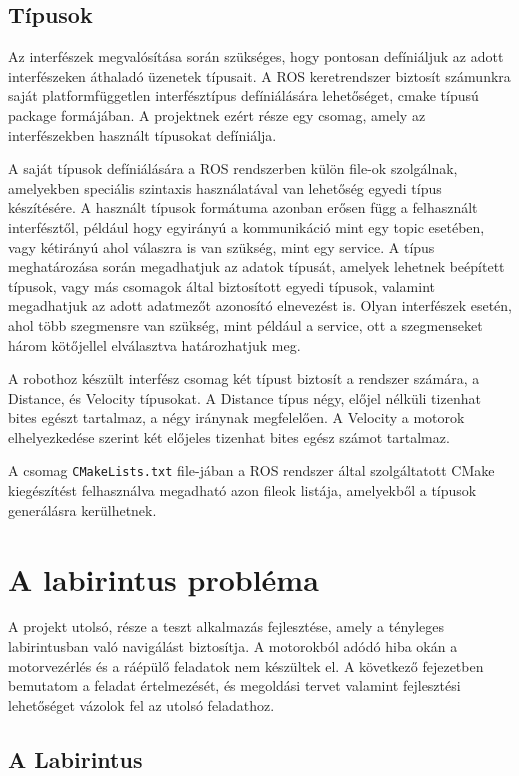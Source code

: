 \subsection{Típusok}

Az interfészek megvalósítása során szükséges, hogy pontosan defíniáljuk az adott
interfészeken áthaladó üzenetek típusait. A ROS keretrendszer biztosít számunkra
saját platformfüggetlen interfésztípus defíniálására lehetőséget, cmake típusú
package formájában. A projektnek ezért része egy csomag, amely az interfészekben
használt típusokat defíniálja. 

A saját típusok defíniálására a ROS rendszerben külön file-ok szolgálnak,
amelyekben speciális szintaxis használatával van lehetőség egyedi típus
készítésére. A használt típusok formátuma azonban erősen függ a felhasznált
interfésztől, például hogy egyirányú a kommunikáció mint egy topic esetében, vagy
kétirányú ahol válaszra is van szükség, mint egy service. A típus meghatározása
során megadhatjuk az adatok típusát, amelyek lehetnek beépített típusok, vagy más
csomagok által biztosított egyedi típusok, valamint megadhatjuk az adott
adatmezőt azonosító elnevezést is. Olyan interfészek esetén, ahol több szegmensre
van szükség, mint például a service, ott a szegmenseket három kötőjellel
elválasztva határozhatjuk meg.

A robothoz készült interfész csomag két típust biztosít a rendszer számára, a
Distance, és Velocity típusokat. A Distance típus négy, előjel nélküli tizenhat
bites egészt tartalmaz, a négy iránynak megfelelően. A Velocity a motorok
elhelyezkedése szerint két előjeles tizenhat bites egész számot tartalmaz.

A csomag \verb|CMakeLists.txt| file-jában a ROS rendszer által szolgáltatott
CMake kiegészítést felhasználva megadható azon fileok listája, amelyekből a
típusok generálásra kerülhetnek.


\section{A labirintus probléma}

A projekt utolsó, része a teszt alkalmazás fejlesztése, amely a tényleges
labirintusban való navigálást biztosítja. A motorokból adódó hiba okán a
motorvezérlés és a ráépülő feladatok nem készültek el. A következő fejezetben
bemutatom a feladat értelmezését, és megoldási tervet valamint fejlesztési
lehetőséget vázolok fel az utolsó feladathoz.

\subsection{A Labirintus}


